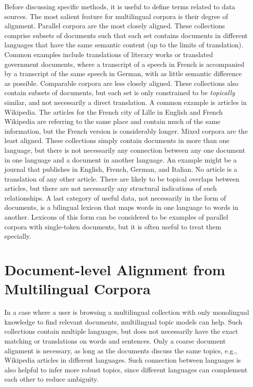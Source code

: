 Before discussing specific methods, it is useful to define terms related to data sources.
The most salient feature for multilingual corpora is their degree of alignment.
Parallel corpora are the most closely aligned. These collections comprise subsets of documents such that each set contains documents in different languages that have the same semantic content (up to the limits of translation).
Common examples include translations of literary works or translated government documents, where a transcript of a speech in French is accompanied by a transcript of the  same speech in German, with as little semantic difference as possible.
Comparable corpora are less closely aligned. 
These collections also contain subsets of documents, but each set is only constrained to be {\em topically} similar, and not necessarily a direct translation.
A common example is articles in Wikipedia.
The articles for the French city of Lille in English and French Wikipedia are referring to the same place and contain much of the same information, but the French version is considerably longer.
Mixed corpora are the least aligned. These collections simply contain documents in more than one language, but there is not necessarily any connection between any one document in one language and a document in another language.
An example might be a journal that publishes in English, French, German, and Italian.
No article is a translation of any other article.
There are likely to be topical overlaps between articles, but there are not necessarily any structural indications of such relationships.
A last category of useful data, not necessarily in the form of documents, is a bilingual lexicon that maps words in one language to words in another.
Lexicons of this form can be considered to be examples of parallel corpora with single-token documents, but it is often useful to treat them specially.

\section{Document-level Alignment from Multilingual Corpora}
\label{sec:doc-align}

In a case where a user is browsing a multilingual collection with only monolingual knowledge
to find relevant documents, multilingual topic models can help. Such collections contain
multiple languages, but does not necessarily have the exact matching or translations 
on words and sentences. Only a coarse document alignment is necessary, as long as the documents
discuss the same topics, e.g., Wikipedia articles in different
languages. Such connection between languages is also helpful to infer
more robust topics, since different languages can complement each
other to reduce ambiguity.

